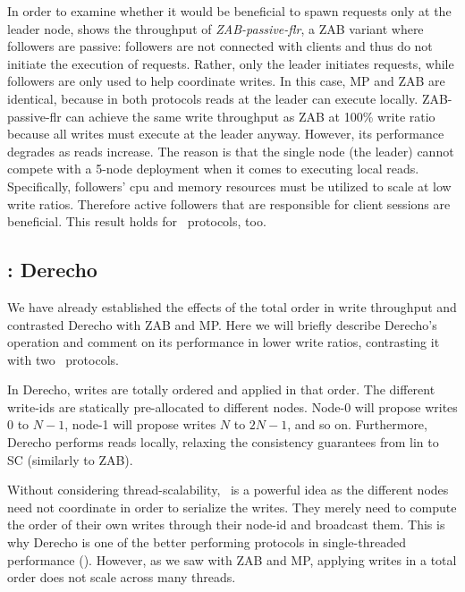 In order to examine whether it would be beneficial to spawn requests only at the leader node,  shows the throughput of \emph{ZAB-passive-flr}, a ZAB variant where followers are passive: \ie followers are not connected with clients and thus do not initiate the execution of requests. Rather, only the leader initiates requests, while followers are only used to help coordinate writes. 
In this case, MP and ZAB are identical, because in both protocols reads at the leader can execute locally.
ZAB-passive-flr can achieve the same write throughput as ZAB at 100\% write ratio because all writes must execute at the leader anyway. However, its performance degrades as reads increase. The reason is that the single node (\ie the leader) cannot compete with a 5-node deployment when it comes to executing local reads. Specifically, followers' cpu and memory resources must be utilized to scale at low write ratios. Therefore active followers that are responsible for client sessions are beneficial. This result holds for \LPKO~protocols, too.





\subsection{\DTO: Derecho}\label{sec:ev:dto}
We have already established the effects of the total order in write throughput and contrasted Derecho with ZAB and MP. 
Here we will briefly describe Derecho's operation and comment on its performance in lower write ratios, contrasting it with two \DPKO~protocols.



In Derecho, writes are totally ordered and applied in that order. The different write-ids are statically pre-allocated to different nodes. Node-0 will propose writes $0$ to $N-1$, node-1 will propose writes $N$ to $2N - 1$, and so on.
Furthermore, Derecho performs reads locally, relaxing the consistency guarantees from lin to SC (similarly to ZAB). 


Without considering thread-scalability, \DTO\ is a powerful idea as the different nodes need not coordinate in order to serialize the writes. They merely need to compute the order of their own writes through their node-id and broadcast them.
This is why 
Derecho is one of the better performing protocols in single-threaded performance (). 
However, as we saw with ZAB and MP, applying writes in a total order does not scale across many threads.

